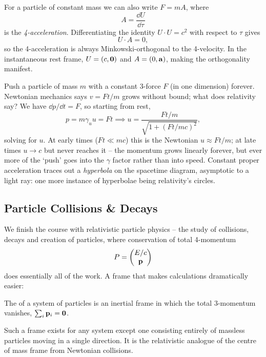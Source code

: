 \documentclass[a4paper]{scrartcl}
\begin{document}
For a particle of constant mass we can also write $F = mA$, where
$$
A = \frac{\dd U}{\dd\tau}
$$
is the \emph{4-acceleration}. Differentiating the identity $U \cdot U = c^2$ with respect to $\tau$ gives
$$
U \cdot A = 0,
$$
so the 4-acceleration is always Minkowski-orthogonal to the 4-velocity. In the instantaneous rest frame, $U = (c, \mathbf{0})$ and $A = (0, \mathbf{a})$, making the orthogonality manifest.

\begin{example}
	Push a particle of mass $m$ with a constant 3-force $F$ (in one dimension) forever. Newtonian mechanics says $v = Ft/m$ grows without bound; what does relativity say? We have $\dd p/\dd t = F$, so starting from rest,
	$$
	p = m \gamma_u u = Ft \implies u = \frac{Ft/m}{\sqrt{1 + (Ft/mc)^2}},
	$$
	solving for $u$. At early times ($Ft \ll mc$) this is the Newtonian $u \approx Ft/m$; at late times $u \to c$ but never reaches it -- the momentum grows linearly forever, but ever more of the `push' goes into the $\gamma$ factor rather than into speed. Constant proper acceleration traces out a \emph{hyperbola} on the spacetime diagram, asymptotic to a light ray: one more instance of hyperbolae being relativity's circles.
\end{example}

\subsection{Particle Collisions \& Decays}

We finish the course with relativistic particle physics -- the study of collisions, decays and creation of particles, where conservation of total 4-momentum
$$
P = \begin{pmatrix} E/c \\ \mathbf{p}\end{pmatrix}
$$
does essentially all of the work. A frame that makes calculations dramatically easier:

\begin{definition}
	The  of a system of particles is an inertial frame in which the total 3-momentum vanishes, $\sum_i \mathbf{p}_i = \mathbf{0}$.
\end{definition}

Such a frame exists for any system except one consisting entirely of massless particles moving in a single direction. It is the relativistic analogue of the centre of mass frame from Newtonian collisions.
\end{document}
